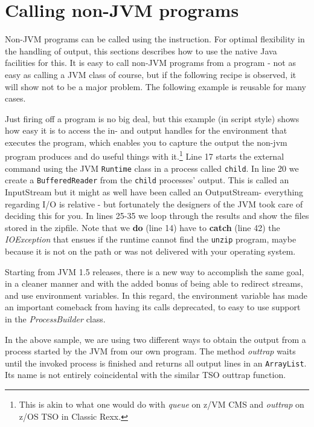 {\chapter{Calling non-JVM programs}
Non-JVM programs can be called using the  instruction.
For optimal flexibility in the handling of output, this sections
describes how to use the native Java facilities for this.
It is easy to call non-JVM programs
from a \nr{} program - not as easy as calling a JVM class of course, but if
the following recipe is observed, it will show not to be a major
problem. The following example is reusable for many cases.
 
Just firing off a program is no big deal, but this example (in script
style) shows how easy it is to access the in- and output handles for
the environment that executes the program, which enables you to
capture the output the non-jvm program produces and do useful things
with it.\footnote{This is akin to what one would do with \emph{queue}
  on z/VM CMS and \emph{outtrap} on z/OS TSO in Classic Rexx.}
Line 17 starts the external command using the JVM \texttt{Runtime}
class in a process called \texttt{child}. In line 20 we create a
\texttt{BufferedReader} from the \texttt{child} processes'
output. This is called an InputStream but it might as well have been
called an OutputStream- everything regarding I/O is relative - but
fortunately the designers of the JVM took care of deciding this for you.
In lines 25-35 we loop through the results and show the files stored
in the zipfile. Note that we \textbf{do} (line 14) have to \textbf{catch} (line
42) the \emph{IOException} that ensues if the runtime cannot find the
\texttt{unzip} program, maybe because it is not on the path or was not
delivered with your operating system. 


Starting from JVM 1.5 releases, there is a new way to accomplish the
same goal, in a cleaner manner and with the added bonus of being able
to redirect streams, and use environment variables. In this regard,
the environment variable has made an important comeback from having
its calls deprecated, to easy to use support in the
\emph{ProcessBuilder} class. 
 
In the above sample, we are using two different ways to obtain the
output from a process started by the JVM from our own program. The
method \emph{outtrap} waits until the invoked process is finished and
returns all output lines in an \texttt{ArrayList}. Its name is not
entirely coincidental with the similar TSO outtrap function. 

}
